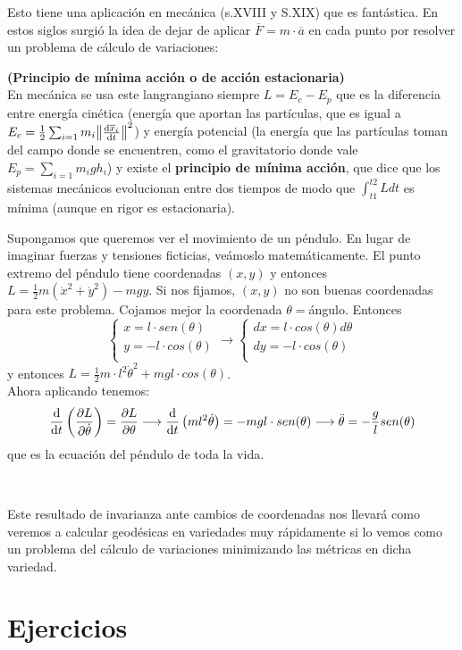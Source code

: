 \documentclass[palatino, bibnumbers]{apuntes}
\begin{document}
Esto tiene una aplicación en mecánica (s.XVIII y S.XIX) que es fantástica. En estos siglos surgió la idea de dejar de aplicar $\overline{F}=m\cdot\overline{a}$ en cada punto por resolver un problema de cálculo de variaciones: 
\newpage
\begin{prop}\textbf{(Principio de mínima acción o de acción estacionaria)}\\
	En mecánica se usa este langrangiano siempre $L=E_c-E_p$ que es la diferencia entre energía cinética (energía que aportan las partículas, que es igual a $E_c=\frac{1}{2}\sum_{i=1}m_i\norm{\dv{\overline{x}_i}{t}}^2$) y energía potencial (la energía que las partículas toman del campo donde se encuentren, como el gravitatorio donde vale $E_p=\sum_{i=1}m_igh_i$) y existe el \textbf{principio de mínima acción}, que dice que los sistemas mecánicos evolucionan entre dos tiempos de modo que $\int_{t1}^{t2}Ldt$ es mínima (aunque en rigor es estacionaria).
\end{prop}
\begin{example}Supongamos que queremos ver el movimiento de un péndulo. En lugar de imaginar fuerzas y tensiones ficticias, veámoslo matemáticamente. El punto extremo del péndulo tiene coordenadas $(x,y)$ y entonces $L=\frac{1}{2}m(\dot{x}^2+\dot{y}^2)-mgy$. Si nos fijamos, $(x,y)$ no son buenas coordenadas para este problema. Cojamos mejor la coordenada $\theta=$ángulo. Entonces$$ \begin{cases}
		x=l\cdot sen(\theta)\\
		y=-l\cdot cos(\theta)\\
	\end{cases}\longrightarrow \begin{cases}
	dx=l\cdot cos(\theta)d\theta\\
	dy=-l\cdot cos(\theta)\\
	\end{cases}$$
	y entonces $L=\frac{1}{2}m\cdot l^2\dot{\theta}^2+mgl\cdot cos(\theta)$. \\Ahora aplicando  tenemos:
	$$\dv{t}\left(\pdv{L}{\dot{\theta}}\right)=\pdv{L}{\theta}\longrightarrow\dv{t}\left(ml^2\dot{\theta}\right)=-mgl\cdot sen(\theta)\longrightarrow\ddot{\theta}=-\frac{g}{l}sen(\theta)$$
	que es la ecuación del péndulo de toda la vida.
\end{example}
\\
\begin{obs}
	Este resultado de invarianza ante cambios de coordenadas  nos llevará como veremos a calcular geodésicas en variedades muy rápidamente si lo vemos como un problema del cálculo de variaciones minimizando las métricas en dicha variedad.
	\end{obs}
\appendix

\chapter{Ejercicios}


\printindex
\end{document}

